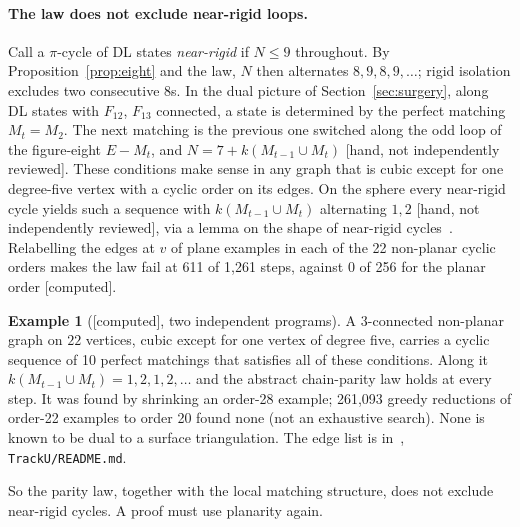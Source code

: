 \documentclass[11pt]{article}
\theoremstyle{definition}
\newtheorem*{example*}{Example}
\newcommand{\lab}[1]{\textsf{[#1]}}
\begin{document}
\paragraph{The law does not exclude near-rigid loops.} Call a $\pi$-cycle of DL states \emph{near-rigid} if $N\le 9$ throughout. By Proposition~\ref{prop:eight} and the law, $N$ then alternates $8,9,8,9,\dots$; rigid isolation excludes two consecutive 8s. In the dual picture of Section~\ref{sec:surgery}, along DL states with $F_{12}$, $F_{13}$ connected, a state is determined by the perfect matching $M_t=M_2$. The next matching is the previous one switched along the odd loop of the figure-eight $E-M_t$, and $N=7+k(M_{t-1}\cup M_t)$ \lab{hand, not independently reviewed}. These conditions make sense in any graph that is cubic except for one degree-five vertex with a cyclic order on its edges. On the sphere every near-rigid cycle yields such a sequence with $k(M_{t-1}\cup M_t)$ alternating $1,2$ \lab{hand, not independently reviewed}, via a lemma on the shape of near-rigid cycles~\cite{vhe2026}. Relabelling the edges at $v$ of plane examples in each of the 22 non-planar cyclic orders makes the law fail at 611 of 1,261 steps, against 0 of 256 for the planar order \lab{computed}.

\begin{example*}[\lab{computed}, two independent programs]
A $3$-connected non-planar graph on $22$ vertices, cubic except for one vertex of degree five, carries a cyclic sequence of 10 perfect matchings that satisfies all of these conditions. Along it $k(M_{t-1}\cup M_t)=1,2,1,2,\dots$ and the abstract chain-parity law holds at every step. It was found by shrinking an order-28 example; 261,093 greedy reductions of order-22 examples to order 20 found none (not an exhaustive search). None is known to be dual to a surface triangulation. The edge list is in~\cite{record}, \texttt{TrackU/README.md}.
\end{example*}
So the parity law, together with the local matching structure, does not exclude near-rigid cycles. A proof must use planarity again.
\end{document}
